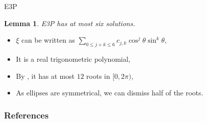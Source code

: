 \documentclass{beamer}
\newtheorem{lem}{Lemma}
\theoremstyle{definition}
\begin{document}
\begin{frame}{E3P}
	\begin{lem}\label{lema:e3p}
		E3P has at most six solutions.
	\end{lem}
\begin{itemize}
	\item $\xi$ can be written as $\sum_{0 \le j+k \le 6} c_{j,k} \cos^j\theta \sin^k\theta$,
	\item It is a real trigonometric polynomial, 
	\item By \cite[p.~150]{powell}, it has at most $12$ roots in $[0, 2\pi)$,
	\item As ellipses are symmetrical, we can dismiss half of the roots.
\end{itemize}
\end{frame}

\begin{frame}[allowframebreaks]
	\frametitle{References}
	
	
\end{frame}
	
\end{document}
